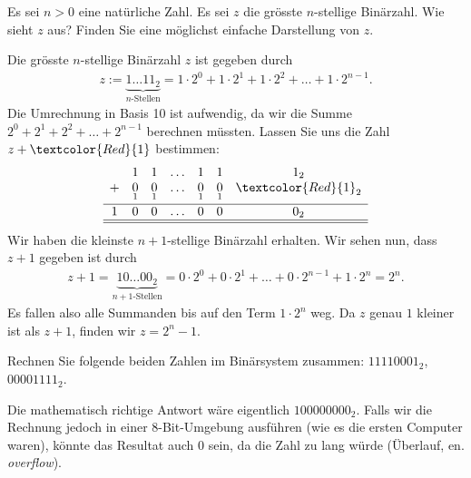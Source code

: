 \begin{mychallenge}
	Es sei $n>0$ eine natürliche Zahl. Es sei $z$ die grösste $n$-stellige Binärzahl. Wie sieht $z$ aus? Finden Sie eine möglichst einfache Darstellung von $z$.
	\begin{myanswer}
		Die grösste $n$-stellige Binärzahl $z$ ist gegeben durch
		\begin{align*}
			z := \underbrace{1\ldots 11_2}_{n\text{-Stellen}} = 1\cdot 2^0 + 1\cdot 2^1 + 1\cdot 2^2 + \ldots + 1\cdot 2^{n-1}.
		\end{align*}
		Die Umrechnung in Basis 10 ist aufwendig, da wir die Summe $2^0 + 2^1 + 2^2 + \ldots + 2^{n-1}$ berechnen müssten. Lassen Sie uns die Zahl $z+\textcolor{Red}{1}$ bestimmen:
		\[
			\begin{array}{ccccccc}
				  & 1               & 1               & \ldots & 1               & 1               & 1_2                               \\
				+ & \underset{1}{0} & \underset{1}{0} & \ldots & \underset{1}{0} & \underset{1}{0} & \underset{}{\textcolor{Red}{1}_2} \\
				\hline
				1 & 0               & 0               & \ldots & 0               & 0               & 0_2                               \\\hline\hline
			\end{array}
		\]
		Wir haben die kleinste $n+1$-stellige Binärzahl erhalten. Wir sehen nun, dass $z+1$ gegeben ist durch
		\begin{align*}
			z+1 = \underbrace{10\ldots 00_2}_{n+1\text{-Stellen}} = 0\cdot 2^0 + 0\cdot 2^1 + \ldots + 0\cdot 2^{n-1} + 1\cdot 2^n = 2^n.
		\end{align*}
		Es fallen also alle Summanden bis auf den Term $ 1\cdot 2^n$ weg. Da $z$ genau $1$ kleiner ist als $z+1$, finden wir $z = 2^n - 1$.
	\end{myanswer}
\end{mychallenge}

\begin{myexercise}
	Rechnen Sie folgende beiden Zahlen im Binärsystem zusammen: $11110001_2$, $00001111_2$.
	\begin{myanswer}
		Die mathematisch richtige Antwort wäre eigentlich $100000000_2$. Falls wir die Rechnung jedoch in einer 8-Bit-Umgebung ausführen (wie es die ersten Computer waren), könnte das Resultat auch 0 sein, da die Zahl zu lang würde (Überlauf, en. \textit{overflow}).
	\end{myanswer}
\end{myexercise}

